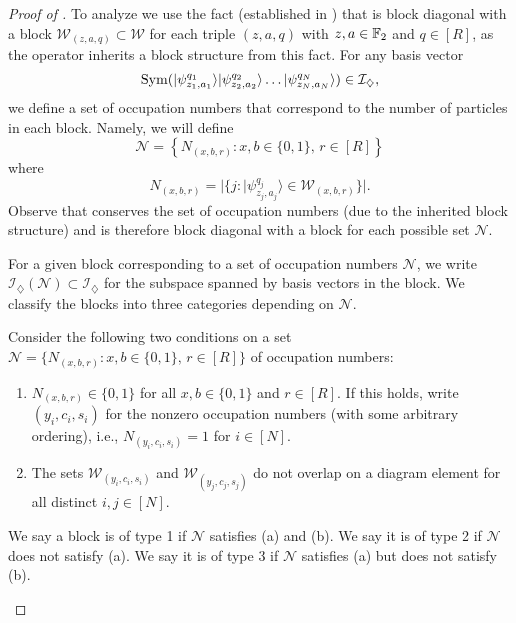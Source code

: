 \documentclass[../thesis-main/thesis-main]{subfiles}
\begin{document}
\begin{proof}[Proof of \protect{}]
To analyze  we use the fact (established in ) that  is block diagonal with a block $\mathcal{W}_{(z,a,q)}\subset\mathcal{W}$ for each triple $(z,a,q)$ with $z,a\in\mathbb{F}_2$ and $q\in[R]$, as the operator  inherits a block structure from this fact. For any basis vector 
\begin{equation}
  \operatorname{Sym}(|\psi_{z_{1},a_{1}}^{q_{1}}\rangle|\psi_{z_{2},a_{2}}^{q_{2}}\rangle\ldots|\psi_{z_{N},a_{N}}^{q_{N}}\rangle)\in\mathcal{I}_{\diamondsuit},
\label{eq:basis_vector_in_scriptF}
\end{equation}
we define a set of occupation numbers that correspond to the number of particles in each block.  Namely, we will define
\begin{equation}
  \mathcal{N}=\left\{ N_{(x,b,r)} \colon x,b\in\{0,1\},\, r\in[R]\right\} 
\end{equation}
where
\begin{equation}
  N_{(x,b,r)}
  =|\{j \colon |\psi_{z_{j},a_{j}}^{q_{j}}\rangle\in\mathcal{W}_{(x,b,r)}\}|.
\end{equation}
Observe that  conserves the set of occupation numbers (due to the inherited block structure) and is therefore block diagonal with a block for each possible set $\mathcal{N}$. 

For a given block corresponding to a set of occupation numbers $\mathcal{N}$, we write $\mathcal{I}_{\diamondsuit}(\mathcal{N})\subset\mathcal{\mathcal{I}_{\diamondsuit}}$ for the subspace spanned by basis vectors  in the block. We classify the blocks into three categories depending on $\mathcal{N}$.

\begin{mdframed}[frametitle=Classification of the blocks of \eq{restriction to script R} according to $\mathcal{N}$]
Consider the following two conditions on a set $\mathcal{N}=\{ N_{(x,b,r)}\colon x,b\in\{0,1\},\, r\in[R]\}$
of occupation numbers:
\begin{enumerate}[label=(\alph*)]
\item $N_{(x,b,r)}\in\{0,1\}$ for all $x,b\in\{0,1\}$ and
$r\in[R]$. If this holds, write $\left(y_{i},c_{i},s_{i}\right)$ for the nonzero occupation numbers (with some arbitrary ordering), i.e., $N_{(y_{i},c_{i},s_{i})}=1$ for $i\in[N]$.
\item The sets $\mathcal{W}_{(y_{i},c_{i},s_{i})}$ and $\mathcal{W}_{(y_{j},c_{j},s_{j})}$
do not overlap on a diagram element for all distinct $i,j\in[N]$.
\end{enumerate}
We say a block is of type 1 if $\mathcal{N}$ satisfies (a) and (b). We say it is of type 2 if $\mathcal{N}$ does not satisfy (a). We say it is of type 3 if $\mathcal{N}$ satisfies (a) but does not satisfy (b).
\end{mdframed}



\end{proof}
\end{document}
